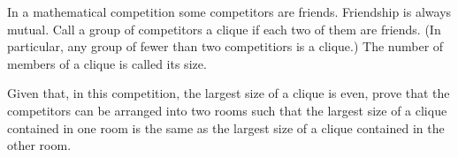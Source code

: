 In a mathematical competition some competitors are friends. Friendship is always mutual. Call a group of competitors a clique
 if each two of them are friends. (In particular, any group of fewer 
than two competitiors is a clique.) The number of members of a clique is
 called its size.

Given that, in this competition, the largest size of a clique is even, 
prove that the competitors can be arranged into two rooms such that the 
largest size of a clique contained in one room is the same as the 
largest size of a clique contained in the other room.
